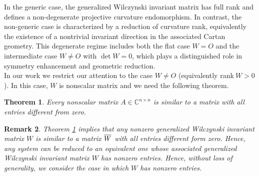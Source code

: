 \documentclass[12pt]{article}
\newtheorem{theorem}{Theorem}[section]
\newtheorem{remark}[theorem]{Remark}
\begin{document}
In the generic case, the generalized Wilczynski invariant matrix has full rank and defines a non-degenerate projective curvature endomorphism. In contrast, the 
non-generic case is characterized by a reduction of curvature rank, equivalently the existence of a nontrivial invariant direction in the associated Cartan geometry. This degenerate regime includes both the flat case $W=O$ and the intermediate case $W\neq O$ with $\det W=0$, which plays a distinguished role in symmetry enhancement and geometric reduction.\\

 In our work we restrict our attention to the case $W\neq O$  (equivalently rank$~W> 0$). In this case, $W$ is nonscalar matrix and we need the following theorem.
\begin{theorem}\cite{p47}\label{s1-thm1}
Every nonscalar matrix $A\in \mathbb{C}^{n\times n}$ is similar to a matrix with all entries different from zero.
\end{theorem}
\begin{remark}\label{rm10}
Theorem \ref{s1-thm1} implies that any nonzero generalized Wilczynski
invariant matrix $W$ is similar to a matrix $\overline{\vphantom{x}W}$ with all entries different form zero. Hence, any system can be reduced to an equivalent one whose associated generalized Wilczynski
invariant matrix $W$ has nonzero entries. Hence, without loss of generality, we consider the case in which $W$ has nonzero entries.
\end{remark}
\end{document}
